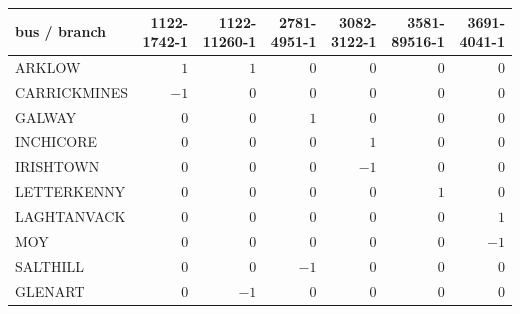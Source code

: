 \setlength{\tabcolsep}{3pt}\renewcommand{\arraystretch}{1.05}
\begin{tabular}{l|rrrrrr}
{\tiny bus / branch} & {\tiny 1122-1742-1} & {\tiny 1122-11260-1} & {\tiny 2781-4951-1} & {\tiny 3082-3122-1} & {\tiny 3581-89516-1} & {\tiny 3691-4041-1}\\ \hline
{\tiny ARKLOW} & $1$ & $1$ & $0$ & $0$ & $0$ & $0$\\
{\tiny CARRICKMINES} & $-1$ & $0$ & $0$ & $0$ & $0$ & $0$\\
{\tiny GALWAY} & $0$ & $0$ & $1$ & $0$ & $0$ & $0$\\
{\tiny INCHICORE} & $0$ & $0$ & $0$ & $1$ & $0$ & $0$\\
{\tiny IRISHTOWN} & $0$ & $0$ & $0$ & $-1$ & $0$ & $0$\\
{\tiny LETTERKENNY} & $0$ & $0$ & $0$ & $0$ & $1$ & $0$\\
{\tiny LAGHTANVACK} & $0$ & $0$ & $0$ & $0$ & $0$ & $1$\\
{\tiny MOY} & $0$ & $0$ & $0$ & $0$ & $0$ & $-1$\\
{\tiny SALTHILL} & $0$ & $0$ & $-1$ & $0$ & $0$ & $0$\\
{\tiny GLENART} & $0$ & $-1$ & $0$ & $0$ & $0$ & $0$
\end{tabular}
